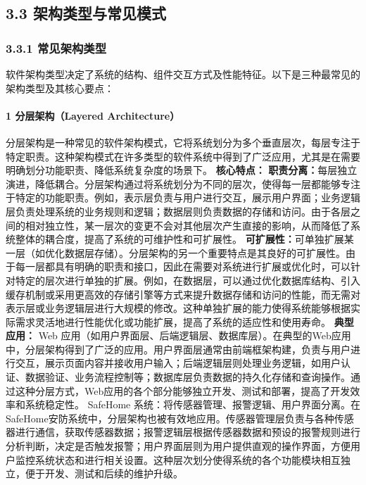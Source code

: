 \subsection{3.3 架构类型与常见模式}\label{ux67b6ux6784ux7c7bux578bux4e0eux5e38ux89c1ux6a21ux5f0f} \subsubsection{3.3.1
常见架构类型}\label{ux5e38ux89c1ux67b6ux6784ux7c7bux578b} 软件架构类型决定了系统的结构、组件交互方式及性能特征。以下是三种最常见的架构类型及其核心要点： \paragraph{1
分层架构（Layered Architecture）}\label{ux5206ux5c42ux67b6ux6784layered-architecture}
分层架构是一种常见的软件架构模式，它将系统划分为多个垂直层次，每层专注于特定职责。这种架构模式在许多类型的软件系统中得到了广泛应用，尤其是在需要明确划分功能职责、降低系统复杂度的场景下。 \textbf{核心特点：}
\textbf{职责分离：}每层独立演进，降低耦合。分层架构通过将系统划分为不同的层次，使得每一层都能够专注于特定的功能职责。例如，表示层负责与用户进行交互，展示用户界面；业务逻辑层负责处理系统的业务规则和逻辑；数据层则负责数据的存储和访问。由于各层之间的相对独立性，某一层次的变更不会对其他层次产生直接的影响，从而降低了系统整体的耦合度，提高了系统的可维护性和可扩展性。
\textbf{可扩展性：}可单独扩展某一层（如优化数据层存储）。分层架构的另一个重要特点是其良好的可扩展性。由于每一层都具有明确的职责和接口，因此在需要对系统进行扩展或优化时，可以针对特定的层次进行单独的扩展。例如，在数据层，可以通过优化数据库结构、引入缓存机制或采用更高效的存储引擎等方式来提升数据存储和访问的性能，而无需对表示层或业务逻辑层进行大规模的修改。这种单独扩展的能力使得系统能够根据实际需求灵活地进行性能优化或功能扩展，提高了系统的适应性和使用寿命。
\textbf{典型应用：} Web
应用（如用户界面层、后端逻辑层、数据库层）。在典型的Web应用中，分层架构得到了广泛的应用。用户界面层通常由前端框架构建，负责与用户进行交互，展示页面内容并接收用户输入；后端逻辑层则处理业务逻辑，如用户认证、数据验证、业务流程控制等；数据库层负责数据的持久化存储和查询操作。通过这种分层方式，Web应用的各个部分能够独立开发、测试和部署，提高了开发效率和系统稳定性。
SafeHome
系统：将传感器管理、报警逻辑、用户界面分离。在SafeHome安防系统中，分层架构也被有效地应用。传感器管理层负责与各种传感器进行通信，获取传感器数据；报警逻辑层根据传感器数据和预设的报警规则进行分析判断，决定是否触发报警；用户界面层则为用户提供直观的操作界面，方便用户监控系统状态和进行相关设置。这种层次划分使得系统的各个功能模块相互独立，便于开发、测试和后续的维护升级。
